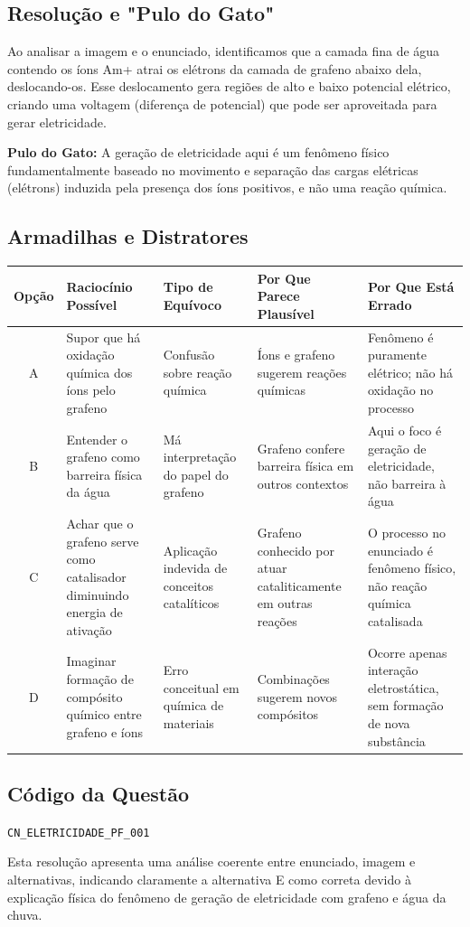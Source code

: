 \documentclass{article}
\begin{document}
\subsection*{Resolução e "Pulo do Gato"}

Ao analisar a imagem e o enunciado, identificamos que a camada fina de água contendo os íons Am+ atrai os elétrons da camada de grafeno abaixo dela, deslocando-os. Esse deslocamento gera regiões de alto e baixo potencial elétrico, criando uma voltagem (diferença de potencial) que pode ser aproveitada para gerar eletricidade.

\medskip

\noindent \textbf{Pulo do Gato:} A geração de eletricidade aqui é um fenômeno físico fundamentalmente baseado no movimento e separação das cargas elétricas (elétrons) induzida pela presença dos íons positivos, e não uma reação química.

\subsection*{Armadilhas e Distratores}

\begin{tabular}{|c|p{5cm}|p{3cm}|p{5cm}|p{5cm}|}
\hline
\textbf{Opção} & \textbf{Raciocínio Possível} & \textbf{Tipo de Equívoco} & \textbf{Por Que Parece Plausível} & \textbf{Por Que Está Errado} \\
\hline
A & Supor que há oxidação química dos íons pelo grafeno & Confusão sobre reação química & Íons e grafeno sugerem reações químicas & Fenômeno é puramente elétrico; não há oxidação no processo \\
\hline
B & Entender o grafeno como barreira física da água & Má interpretação do papel do grafeno & Grafeno confere barreira física em outros contextos & Aqui o foco é geração de eletricidade, não barreira à água \\
\hline
C & Achar que o grafeno serve como catalisador diminuindo energia de ativação & Aplicação indevida de conceitos catalíticos & Grafeno conhecido por atuar cataliticamente em outras reações & O processo no enunciado é fenômeno físico, não reação química catalisada \\
\hline
D & Imaginar formação de compósito químico entre grafeno e íons & Erro conceitual em química de materiais & Combinações sugerem novos compósitos & Ocorre apenas interação eletrostática, sem formação de nova substância \\
\hline
\end{tabular}

\subsection*{Código da Questão}
\texttt{CN\_ELETRICIDADE\_PF\_001}

\bigskip

\noindent Esta resolução apresenta uma análise coerente entre enunciado, imagem e alternativas, indicando claramente a alternativa E como correta devido à explicação física do fenômeno de geração de eletricidade com grafeno e água da chuva.
\end{document}
